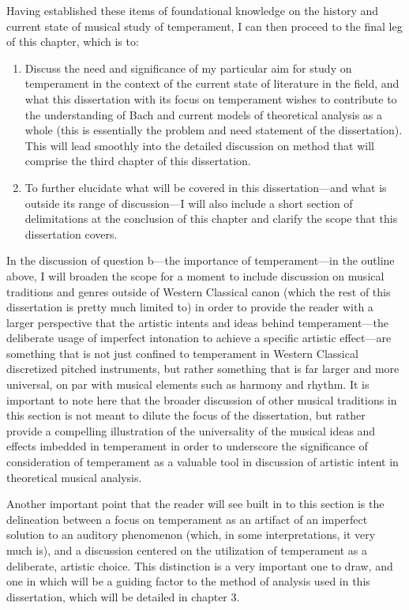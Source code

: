 Having established these items of foundational knowledge on the history
and current state of musical study of temperament, I can then proceed to
the final leg of this chapter, which is to:

\begin{enumerate}
\def\labelenumi{\arabic{enumi}.}
\setcounter{enumi}{4}
\tightlist
\item
  Discuss the need and significance of my particular aim for study on
  temperament in the context of the current state of literature in the
  field, and what this dissertation with its focus on temperament wishes
  to contribute to the understanding of Bach and current models of
  theoretical analysis as a whole (this is essentially the problem and
  need statement of the dissertation). This will lead smoothly into the
  detailed discussion on method that will comprise the third chapter of
  this dissertation.
\item
  To further elucidate what will be covered in this dissertation---and
  what is outside its range of discussion---I will also include a short
  section of delimitations at the conclusion of this chapter and clarify
  the scope that this dissertation covers.
\end{enumerate}

In the discussion of question b---the importance of temperament---in the
outline above, I will broaden the scope for a moment to include
discussion on musical traditions and genres outside of Western Classical
canon (which the rest of this dissertation is pretty much limited to) in
order to provide the reader with a larger perspective that the artistic
intents and ideas behind temperament---the deliberate usage of imperfect
intonation to achieve a specific artistic effect---are something that is
not just confined to temperament in Western Classical discretized
pitched instruments, but rather something that is far larger and more
universal, on par with musical elements such as harmony and rhythm. It
is important to note here that the broader discussion of other musical
traditions in this section is not meant to dilute the focus of the
dissertation, but rather provide a compelling illustration of the
universality of the musical ideas and effects imbedded in temperament in
order to underscore the significance of consideration of temperament as
a valuable tool in discussion of artistic intent in theoretical musical
analysis.

Another important point that the reader will see built in to this
section is the delineation between a focus on temperament as an artifact
of an imperfect solution to an auditory phenomenon (which, in some
interpretations, it very much is), and a discussion centered on the
utilization of temperament as a deliberate, artistic choice. This
distinction is a very important one to draw, and one in which will be a
guiding factor to the method of analysis used in this dissertation,
which will be detailed in chapter 3.

